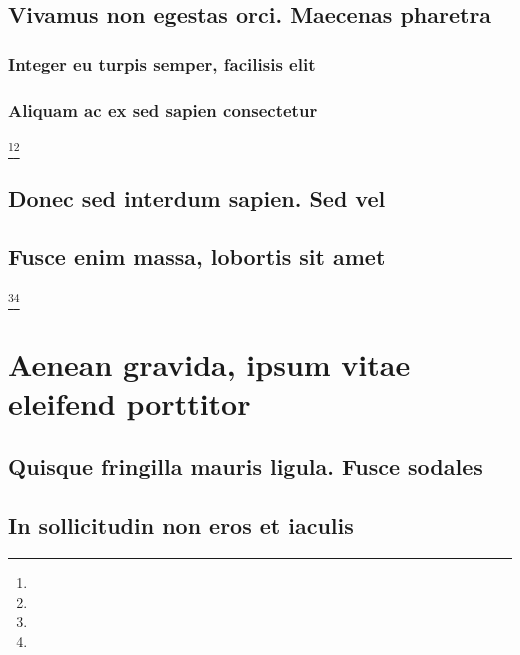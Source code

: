 \documentclass[%
  english,%
]{doctorate}
\begin{document}
\lipsum[1-8]

\subsection{Vivamus non egestas orci. Maecenas pharetra}

\lipsum[1-8]

\subsubsection{Integer eu turpis semper, facilisis elit}

\lipsum[1-8]

\subsubsection{Aliquam ac ex sed sapien consectetur}

\lipsum[1-8]\footnote{\lipsum[1]}\footnote{\lipsum[1]}

\subsection{Donec sed interdum sapien. Sed vel}

\lipsum[1-8]

\subsection{Fusce enim massa, lobortis sit amet}

\lipsum[1-8]\footnote{\lipsum[1]}\footnote{\lipsum[1]}

\section{Aenean gravida, ipsum vitae eleifend porttitor}

\lipsum[1-8]

\subsection{Quisque fringilla mauris ligula. Fusce sodales}

\lipsum[1-8]

\subsection{In sollicitudin non eros et iaculis}

\lipsum[1-8]
\end{document}
